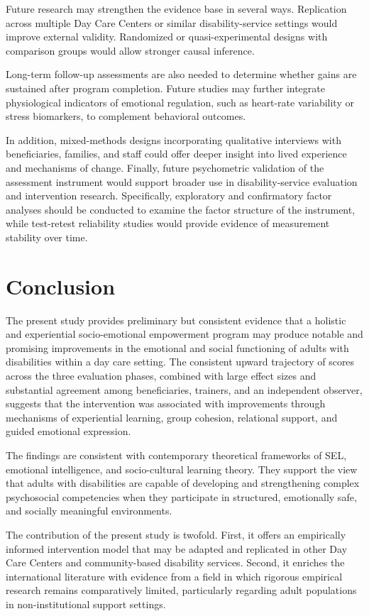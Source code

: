 \documentclass[12pt,a4paper]{article}
\begin{document}
Future research may strengthen the evidence base in several ways. Replication across multiple Day Care Centers or similar disability-service settings would improve external validity. Randomized or quasi-experimental designs with comparison groups would allow stronger causal inference.

Long-term follow-up assessments are also needed to determine whether gains are sustained after program completion. Future studies may further integrate physiological indicators of emotional regulation, such as heart-rate variability or stress biomarkers, to complement behavioral outcomes.

In addition, mixed-methods designs incorporating qualitative interviews with beneficiaries, families, and staff could offer deeper insight into lived experience and mechanisms of change. Finally, future psychometric validation of the assessment instrument would support broader use in disability-service evaluation and intervention research. Specifically, exploratory and confirmatory factor analyses should be conducted to examine the factor structure of the instrument, while test-retest reliability studies would provide evidence of measurement stability over time.


\section{Conclusion}

The present study provides preliminary but consistent evidence that a holistic and experiential socio-emotional empowerment program may produce notable and promising improvements in the emotional and social functioning of adults with disabilities within a day care setting. The consistent upward trajectory of scores across the three evaluation phases, combined with large effect sizes and substantial agreement among beneficiaries, trainers, and an independent observer, suggests that the intervention was associated with improvements through mechanisms of experiential learning, group cohesion, relational support, and guided emotional expression.

The findings are consistent with contemporary theoretical frameworks of SEL, emotional intelligence, and socio-cultural learning theory. They support the view that adults with disabilities are capable of developing and strengthening complex psychosocial competencies when they participate in structured, emotionally safe, and socially meaningful environments.

The contribution of the present study is twofold. First, it offers an empirically informed intervention model that may be adapted and replicated in other Day Care Centers and community-based disability services. Second, it enriches the international literature with evidence from a field in which rigorous empirical research remains comparatively limited, particularly regarding adult populations in non-institutional support settings.
\end{document}
